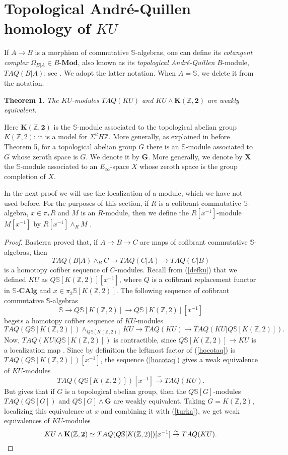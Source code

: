 \documentclass[a4paper,11pt]{amsart} %
\theoremstyle{definition} \newtheorem{defn}[equation]{Definition}
\theoremstyle{remark} \newtheorem{notation}[equation]{Notation}
\theoremstyle{plain} \newtheorem{teo}[equation]{Theorem}
\theoremstyle{plain} \newtheorem{lema}[equation]{Lemma}
\theoremstyle{plain} \newtheorem{prop}[equation]{Proposition}
\theoremstyle{plain} \newtheorem{corolario}[equation]{Corollary}
\theoremstyle{remark} \newtheorem{obs}[equation]{Remark}
\theoremstyle{remark} \newtheorem{sideobs}[equation]{Side remark}
\theoremstyle{remark} \newtheorem{ejercicio}[equation]{Exercise}
\theoremstyle{definition} \newtheorem{notn}[equation]{Notation}
\theoremstyle{remark} \newtheorem{ej}[equation]{Example}
\theoremstyle{remark} \newtheorem{contraej}[equation]{Counterexample}
\theoremstyle{plain} \newtheorem{conj}[equation]{Conjecture}
\renewcommand{\1}{\ensuremath{\mathbbm{1}}}
\renewcommand{\S}{\mathbb{S}}
\newcommand{\Z}{\mathbb{Z}}
\newcommand{\bprf}{\begin{proof}}
\newcommand{\eprf}{\end{proof}}
\newcommand{\bteo}{\begin{teo}}
\newcommand{\eteo}{\end{teo}}
\newcommand{\Mod}{\mbox{-}\mathbf{Mod}}
\newcommand{\SCAlg}{\ensuremath{\mathbb{S}}\mbox{-}\ensuremath{\mathbf{CAlg}}}
\numberwithin{equation}{section}
\newcommand{\K}{\mathbf{K(\Z,2)}}
\begin{document}
\section{Topological André-Quillen homology of \texorpdfstring{$KU$}{KU}} \label{section:taq}

If $A\to B$ is a morphism of commutative $\S$-algebras, one can define its \emph{cotangent complex} $\Omega_{B|A}\in B\Mod$, also known as its \emph{topological André-Quillen} $B$-module, $TAQ(B|A)$: see \cite{basterra}. %
We adopt the latter notation. When $A=\S$, we delete it from the notation.

%
\bteo \label{taqku1} The $KU$-modules $TAQ(KU)$ and $KU \wedge \K$ are weakly equivalent.
\eteo
Here $\K$ is the $\S$-module associated to the topological abelian group $K(\Z,2)$: it is a model for $\Sigma^2 H \Z$. %
More generally, as explained in \cite{basterra-mandell} before Theorem 5, for a topological abelian group $G$ there is an $\S$-module associated to $G$ whose zeroth space is $G$. We denote it by $\mathbf{G}$. More generally, we denote by $\mathbf{X}$ the $\S$-module associated to an $E_\infty$-space $X$ whose zeroth space is the group completion of $X$.

In the next proof we will use the localization of a module, which we have not used before. For the purposes of this section, if $R$ is a cofibrant commutative $\S$-algebra, $x\in \pi_*R$ and $M$ is an $R$-module, then we define the $R[x^{-1}]$-module $M[x^{-1}]$ by $R[x^{-1}]\wedge_R M$ \cite[VII.4]{ekmm}.
\bprf Basterra \cite[Proposition 4.2]{basterra} proved that, if $A\to B\to C$ are maps of cofibrant commutative $\S$-algebras, then
\[TAQ(B|A) \wedge_B C \to TAQ(C|A) \to TAQ(C|B)\]
is a homotopy cofiber sequence of $C$-modules. Recall from (\ref{defku}) that we defined $KU$ as $Q\S[K(\Z,2)][x^{-1}]$, where $Q$ is a cofibrant replacement functor in $\SCAlg$ and $x\in \pi_2\S[K(\Z,2)]$. The following sequence of cofibrant commutative $\S$-algebras
\[\S\to Q\S[K(\Z,2)]\to Q\S[K(\Z,2)][x^{-1}]\]
begets a homotopy cofiber sequence of $KU$-modules
\begin{equation}\label{hocotaq}TAQ(Q\S[K(\Z,2)]) \wedge_{Q\S[K(\Z,2)]} KU \to TAQ(KU) \to TAQ(KU|Q\S[K(\Z,2)]).\end{equation}
Now, %
$TAQ(KU|Q\S[K(\Z,2)])$ is contractible, since $Q\S[K(\Z,2)]\to KU$ is a localization map \cite[Remark 3.4]{mccarthy-minasian}. Since by definition the leftmost factor of (\ref{hocotaq}) is $TAQ(Q\S[K(\Z,2)])[x^{-1}]$, 
%
the sequence (\ref{hocotaq}) gives a weak equivalence of $KU$-modules
\begin{equation}\label{turka}TAQ(Q\S[K(\Z,2)])[x^{-1}]\stackrel{\sim}{\to} TAQ(KU).\end{equation}
But \cite[Theorem 5]{basterra-mandell} gives that if $G$ is a topological abelian group, then the $Q\S[G]$-modules $TAQ(Q\S[G])$ and $Q\S[G] \wedge \mathbf{G}$ are weakly equivalent. 
Taking $G=K(\Z,2)$, localizing this equivalence at $x$ and combining it with (\ref{turka}), we get weak equivalences of $KU$-modules
\[KU \wedge \K \simeq TAQ(Q\S[K(\Z,2)])[x^{-1}] \stackrel{\sim}{\to} TAQ(KU). \qedhere\]
\eprf
\end{document}
